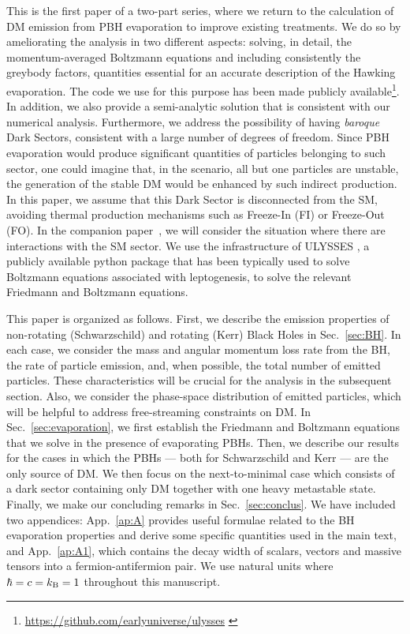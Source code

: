 \documentclass[aps,prd,reprint,twocolumn,preprintnumbers,floatfix,nofootinbib]{revtex4-1}
\begin{document}
This is the first paper of a two-part series, where we return to the calculation of DM emission from PBH evaporation to improve existing treatments. We do so by ameliorating the analysis in two different aspects: solving, in detail, the momentum-averaged Boltzmann equations and including consistently the greybody factors, quantities essential for an accurate description of the Hawking evaporation. The code we use for this purpose has been made publicly available\footnote{\url{https://github.com/earlyuniverse/ulysses} \href{https://github.com/earlyuniverse/ulysses}{\faGithub}}. 
In addition, we also provide a semi-analytic solution that is consistent with our numerical analysis. Furthermore, we address the possibility of having \emph{baroque} Dark Sectors, consistent with a large number of degrees of freedom. Since PBH evaporation would produce significant quantities of particles belonging to such sector, one could imagine that, in the scenario, all but one particles are unstable, the generation of the stable DM would be enhanced by such indirect production. In this paper, we assume that this Dark Sector is disconnected from the SM, avoiding thermal production mechanisms such as Freeze-In (FI) or Freeze-Out (FO). In the companion paper~\cite{paperB}, we will consider the situation where there are interactions with the SM sector. We use the infrastructure of {\sc ULYSSES} \cite{Granelli:2020pim}, a publicly available python package that has been typically used to solve Boltzmann equations associated with leptogenesis, to solve the relevant Friedmann and  Boltzmann equations.

This paper is organized as follows. First, we describe  the emission properties of non-rotating (Schwarzschild) and rotating (Kerr) Black Holes in Sec.~\ref{sec:BH}. In each case, we consider the mass and angular momentum loss rate from the BH, the rate of particle emission, and, when possible, the total number of emitted particles. These characteristics will be crucial for the analysis in the subsequent section. Also, we consider the phase-space distribution of emitted particles, which will be helpful to address free-streaming constraints on DM. In Sec.~\ref{sec:evaporation}, we first establish the Friedmann and Boltzmann equations that we solve in the presence of evaporating PBHs. Then, we describe our results for the cases in which the PBHs --- both for Schwarzschild and Kerr --- are the only source of DM. We then focus on the next-to-minimal case which consists of a dark sector containing only DM together with one heavy metastable state. Finally, we make our concluding remarks in Sec.~\ref{sec:conclus}. We have included two  appendices: App.~\ref{ap:A} provides useful formulae related to the BH evaporation properties and derive some specific quantities used in the main text, and App.~\ref{ap:A1}, which contains the decay width of scalars, vectors and massive tensors into a fermion-antifermion pair. We use natural units where $\hbar = c = k_{\rm B} = 1$ throughout this manuscript. 
\end{document}
